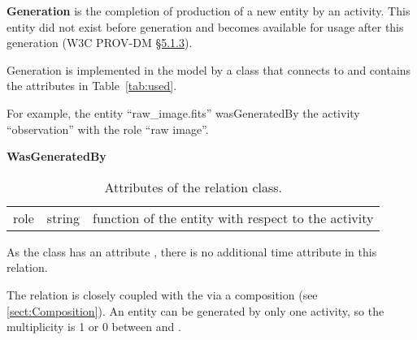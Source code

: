 \textbf{Generation} is the completion of production of a new entity by an activity. This entity did not exist before generation and becomes available for usage after this generation (W3C PROV-DM \href{https://www.w3.org/TR/prov-dm/#term-Generation}{\S5.1.3}).
        
Generation is implemented in the model by a class  that connects  to  and contains the attributes in Table~\ref{tab:used}.

For example, the entity ``raw\_image.fits'' wasGeneratedBy the activity ``observation'' with the role ``raw image''.

\begin{table}[ht]
\small
{}\textwidth
\textbf{\normalsize WasGeneratedBy}\vspace{0.25em}\\
\begin{tabulary}{1.0\textwidth}{llL}
\toprule
{} &  & \\
\midrule
role   &  string   &  function of the entity with respect to the activity\\
\bottomrule
\end{tabulary}
\caption[Attributes of the  relation class]{Attributes of the  relation class.}
\label{tab:wasgeneratedby}
\end{table}

As the  class has an attribute , there is no additional time attribute in this relation.

The  relation is closely coupled with the  via a composition (see \ref{sect:Composition}). 
An entity can be generated by only one activity, so the multiplicity is 1 or 0 between  and .


